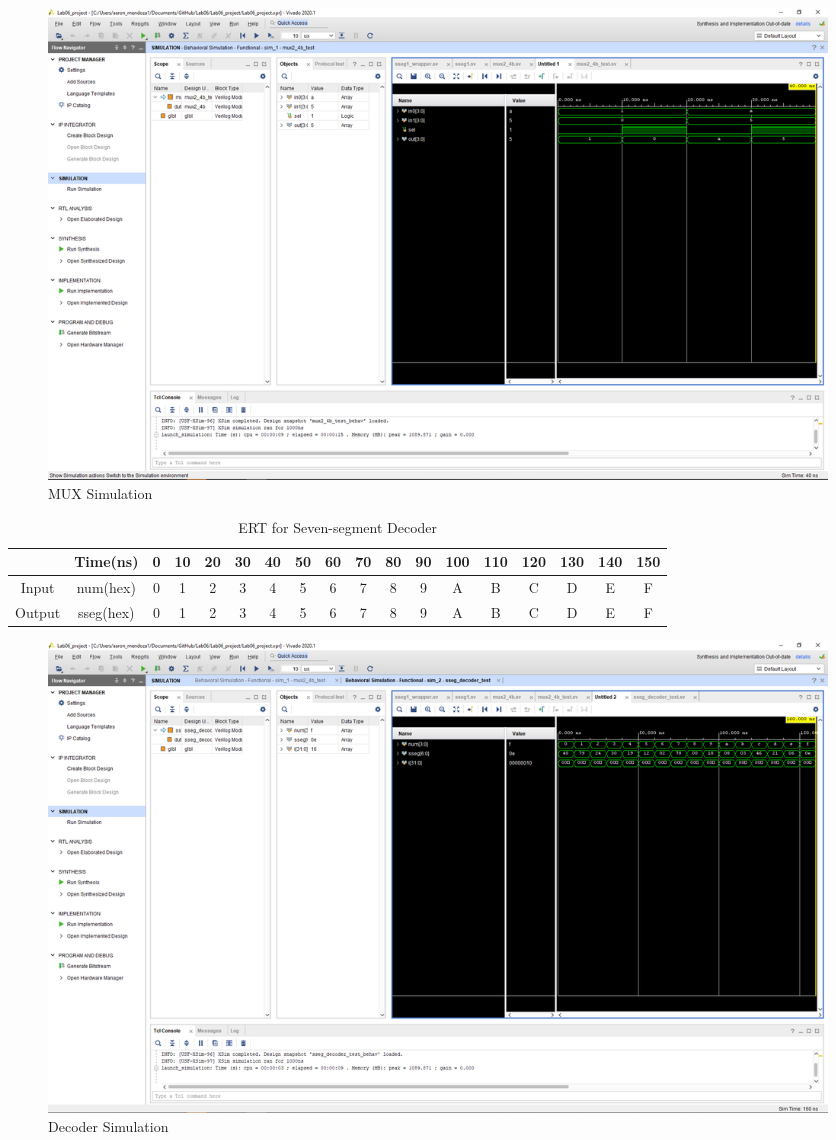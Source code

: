 \documentclass[11pt]{article}
\begin{document}
\begin{figure}[ht]\centering
	\includegraphics[width=1\textwidth,trim=21cm 18cm 0.5cm 4.7cm,clip]{mux_test_screenshot}
	\caption{MUX Simulation}
	\label{fig:sim_with_table}
\end{figure}


\begin{table}[ht]\centering
	\caption{ERT for Seven-segment Decoder}
	\label{tbl:example_table}
	\begin{tabular}{cc|cccccccccccccccc}
		\toprule
		& Time(ns) & 0 & 10 & 20 & 30 & 40 & 50 & 60 & 70 & 80 & 90 & 100 & 110 & 120 & 130 & 140 & 150 \\
		\midrule
		Input & num(hex) & 0 & 1 & 2 & 3 & 4 & 5 & 6 & 7 & 8 & 9 & A & B & C & D & E & F \\
		Output & sseg(hex)  & 0 & 1 & 2 & 3 & 4 & 5 & 6 & 7 & 8 & 9 & A & B & C & D & E & F \\
		\bottomrule
	\end{tabular} 
\end{table}

\begin{figure}[ht]\centering
	\includegraphics[width=1\textwidth,trim=21cm 18cm 0.5cm 4.7cm,clip]{sseg_decoder_screenshot}
	\caption{Decoder Simulation}
	\label{fig:sim_with_table}
\end{figure}
\end{document}
